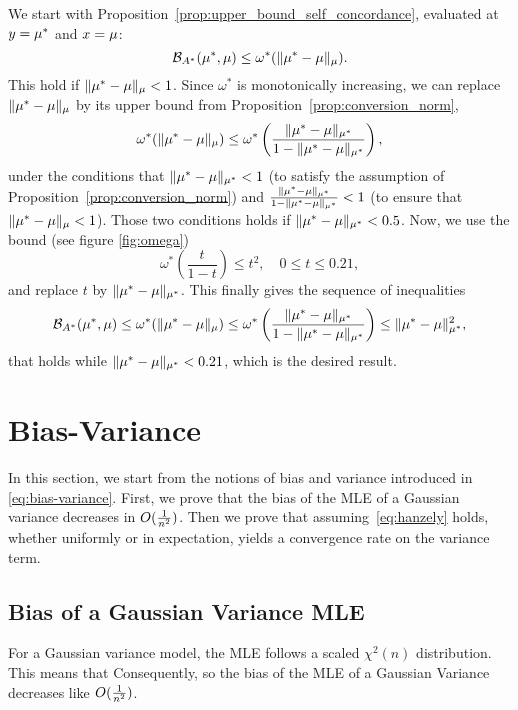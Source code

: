 \begin{subappendices}
We start with Proposition~\ref{prop:upper_bound_self_concordance}, evaluated at $y=\mu^*$ and $x=\mu$:
\[
	{\mathcal B}_{A^*}(\mu^*,\mu) \leq \omega^*(\|\mu^*-\mu\|_{\mu}).
\]
This hold if $\|\mu^*-\mu\|_{\mu}<1$. Since $\omega^*$ is monotonically increasing, we can replace $\|\mu^*-\mu\|_{\mu}$ by its upper bound from Proposition~\ref{prop:conversion_norm},
\[
	\omega^*(\|\mu^*-\mu\|_{\mu}) \leq \omega^*\left(\frac{\|\mu^*-\mu\|_{\mu^*}}{1-\|\mu^*-\mu\|_{\mu^*}}\right),
\]
under the conditions that $\|\mu^*-\mu\|_{\mu^*}<1$ (to satisfy the assumption of Proposition~\ref{prop:conversion_norm}) and $\frac{\|\mu^*-\mu\|_{\mu^*}}{1-\|\mu^*-\mu\|_{\mu^*}} <1$ (to ensure that $\|\mu^*-\mu\|_{\mu} <1$). Those two conditions holds if $\|\mu^*-\mu\|_{\mu^*} <0.5$. Now, we use the bound (see figure \ref{fig:omega})
\[
	\omega^*\left(\frac{t}{1-t}\right) \leq t^2, \quad 0\leq t \leq 0.21,
\]
and replace $t$ by $\|\mu^*-\mu\|_{\mu^*}$. This finally gives the sequence of inequalities
\[
	{\mathcal B}_{A^*}(\mu^*,\mu) \leq \omega^*(\|\mu^*-\mu\|_{\mu}) \leq \omega^*\left(\frac{\|\mu^*-\mu\|_{\mu^*}}{1-\|\mu^*-\mu\|_{\mu^*}}\right) \leq \|\mu^*-\mu\|_{\mu^*}^2,
\]
that holds while $ \|\mu^*-\mu\|_{\mu^*}<0.21$, which is the desired result.



\section{Bias-Variance}
\label{app:bias-variance}
In this section, we start from the notions of bias and variance introduced in \cref{eq:bias-variance}.
First, we prove that the bias of the MLE of a Gaussian variance decreases in $O(\frac{1}{n^2})$. 
Then we prove that assuming~\eqref{eq:hanzely} holds, whether uniformly or in expectation, yields a convergence rate on the variance term.

\subsection{Bias of a Gaussian Variance MLE}
For a Gaussian variance model, the MLE follows a scaled $\chi^2(n)$ distribution. 
This means that
Consequently,
so the bias of the MLE of a Gaussian Variance decreases like $O(\frac{1}{n^2})$.


\end{subappendices}

